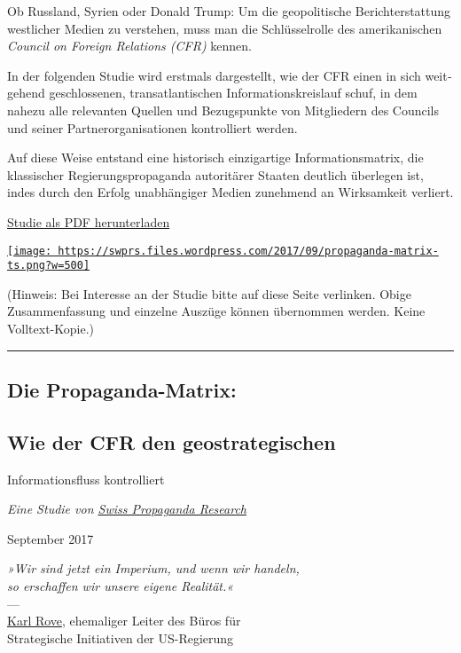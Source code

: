 Ob Russland, Syrien oder Donald Trump: Um die geopolitische
Bericht­erstattung westlicher Medien zu verstehen, muss man die
Schlüssel­rolle des amerikanischen \emph{Council on Foreign Relations
(CFR)} kennen.

In der folgenden Studie wird erstmals dargestellt, wie der CFR einen in
sich weit­ge­hend geschlossenen, trans­atlantischen
Informations­­kreislauf schuf, in dem nahezu alle relevanten Quellen und
Bezugs­punkte von Mitgliedern des Councils und seiner
Partner­­organisationen kontrolliert werden.

Auf diese Weise entstand eine historisch einzigartige
Informations­­matrix, die klassischer Regierungs­propaganda autoritärer
Staaten deutlich überlegen ist, indes durch den Erfolg unabhängiger
Medien zunehmend an Wirksamkeit verliert.

\href{https://swprs.files.wordpress.com/2018/07/die-propaganda-matrix-spr-hdv.pdf}{Studie
als PDF herunterladen}

\href{https://swprs.files.wordpress.com/2017/09/propaganda-matrix-ts.png}{\texttt{[image: https://swprs.files.wordpress.com/2017/09/propaganda-matrix-ts.png?w=500]}}

(Hinweis: Bei Interesse an der Studie bitte auf diese Seite verlinken.
Obige Zusammen­fassung und einzelne Auszüge können übernommen werden.
Keine Volltext-Kopie.)

\begin{center}\rule{0.5\linewidth}{\linethickness}\end{center}

\hypertarget{die-propaganda-matrix-1}{%
\subsection{Die Propaganda-Matrix:}\label{die-propaganda-matrix-1}}

\hypertarget{wie-der-cfr-den-geostrategischen}{%
\subsection{Wie der CFR den
geostrategischen}\label{wie-der-cfr-den-geostrategischen}}

Informationsfluss kontrolliert

\emph{Eine Studie von \href{https://swprs.org/}{Swiss Propaganda
Research}}

September 2017

\emph{»Wir sind jetzt ein Imperium, und wenn wir handeln,\\
so erschaffen wir unsere eigene Realität.«}\\
---\\
\href{https://en.wikiquote.org/wiki/Karl_Rove}{Karl Rove}, ehemaliger
Leiter des Büros für\\
Strategische Initiativen der US-Regierung

